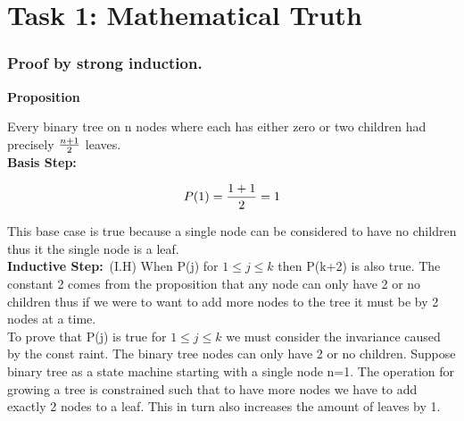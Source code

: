 \chapter{Task 1: Mathematical Truth}

\small \subsection*{Proof by strong induction.}

\textbf{Proposition}

Every binary tree on n nodes where each has either zero or two children had precisely ${n+1\over2}$ leaves.\\

\textbf{Basis Step:}\

\begin{align*}
    P(1) = {{1+1}\over 2} = 1
\end{align*}

This base case is true because a single node can be considered to have no children thus it the single node is a leaf.\\


\textbf{Inductive Step:}\
(I.H) When P(j) for $1 \leq j \leq k$  then P(k+2) is also true. The constant 2 comes from the proposition that any node can only have 2 or no children thus if we were to want to add more nodes to the tree it must be by 2 nodes at a time.\\

To prove that P(j) is true for $1 \leq j \leq k$ we must consider the invariance caused by the const raint. The binary tree nodes can only have 2 or no children. Suppose binary tree as a state machine starting with a single node n=1. The operation for growing a tree is constrained such that to have more nodes we have to add exactly 2 nodes to a leaf. This in turn also increases the amount of leaves by 1.




% 	
	



